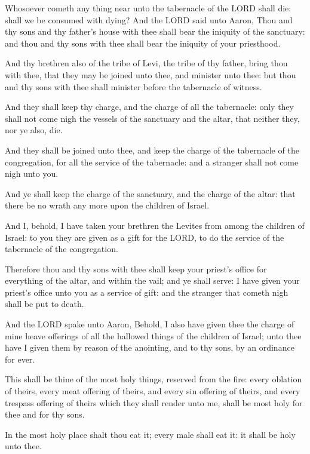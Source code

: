 \Verse Whosoever cometh any thing near unto the tabernacle of the LORD
shall die: shall we be consumed with dying?  
\Chapter
\Verse And the LORD said
unto Aaron, Thou and thy sons and thy father's house with thee shall
bear the iniquity of the sanctuary: and thou and thy sons with thee
shall bear the iniquity of your priesthood.

\Verse And thy brethren also of the tribe of Levi, the tribe of thy
father, bring thou with thee, that they may be joined unto thee, and
minister unto thee: but thou and thy sons with thee shall minister
before the tabernacle of witness.

\Verse And they shall keep thy charge, and the charge of all the
tabernacle: only they shall not come nigh the vessels of the sanctuary
and the altar, that neither they, nor ye also, die.

\Verse And they shall be joined unto thee, and keep the charge of the
tabernacle of the congregation, for all the service of the tabernacle:
and a stranger shall not come nigh unto you.

\Verse And ye shall keep the charge of the sanctuary, and the charge of
the altar: that there be no wrath any more upon the children of
Israel.

\Verse And I, behold, I have taken your brethren the Levites from among
the children of Israel: to you they are given as a gift for the LORD,
to do the service of the tabernacle of the congregation.

\Verse Therefore thou and thy sons with thee shall keep your priest's
office for everything of the altar, and within the vail; and ye shall
serve: I have given your priest's office unto you as a service of
gift: and the stranger that cometh nigh shall be put to death.

\Verse And the LORD spake unto Aaron, Behold, I also have given thee the
charge of mine heave offerings of all the hallowed things of the
children of Israel; unto thee have I given them by reason of the
anointing, and to thy sons, by an ordinance for ever.

\Verse This shall be thine of the most holy things, reserved from the
fire: every oblation of theirs, every meat offering of theirs, and
every sin offering of theirs, and every trespass offering of theirs
which they shall render unto me, shall be most holy for thee and for
thy sons.

\Verse In the most holy place shalt thou eat it; every male shall eat
it: it shall be holy unto thee.

